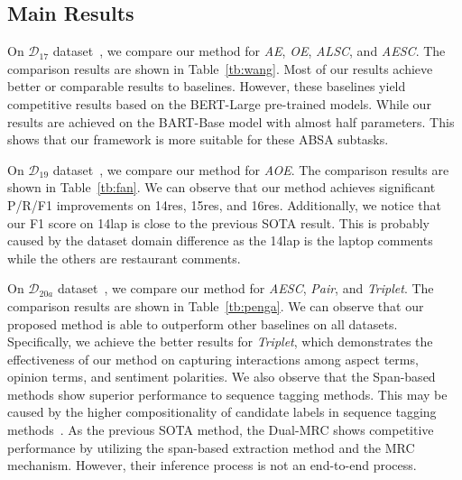 \documentclass[11pt,a4paper]{article}
\begin{document}
\subsection{Main Results}
On   $\mathcal{D}_{17}$ dataset~\citep{DBLP:conf/aaai/WangPDX17}, we compare our method for \emph{AE}, \emph{OE}, \emph{ALSC}, and \emph{AESC}. The comparison results are shown in Table~\ref{tb:wang}.  Most of our results achieve better or comparable results to baselines.  However, these baselines yield competitive results based on the BERT-Large pre-trained models. While our results are achieved on the BART-Base model with almost half parameters. This shows that our framework is more suitable for these ABSA subtasks.

On $\mathcal{D}_{19}$ dataset~\citep{DBLP:conf/naacl/FanWDHC19}, we compare our method for \emph{AOE}. The comparison results are shown in Table~\ref{tb:fan}.
We can observe that  our method achieves  significant P/R/F1 improvements on 14res, 15res, and 16res. Additionally, we notice that  our F1 score  on 14lap is close to the previous SOTA result. This is probably caused by the dataset domain difference as the 14lap is the laptop comments while the others are restaurant comments.


On $\mathcal{D}_{20a}$ dataset~\citep{DBLP:conf/aaai/PengXBHLS20}, we compare our method for  \emph{AESC}, \emph{Pair}, and \emph{Triplet}. The comparison results are shown in Table~\ref{tb:penga}. We can observe that our proposed method is able to outperform  other baselines on all datasets. Specifically, we achieve the better results  for \emph{Triplet}, which  demonstrates the effectiveness of our method on capturing interactions among aspect terms, opinion terms, and sentiment polarities. We also observe that the Span-based methods show superior performance to sequence tagging methods. This may be caused by the higher compositionality of candidate labels in  sequence tagging methods~\citep{DBLP:conf/acl/HuPHLL19}. As the previous SOTA method, the Dual-MRC shows competitive performance by utilizing  the span-based extraction method and the MRC mechanism. However, their inference process is  not an  end-to-end process.
\end{document}
